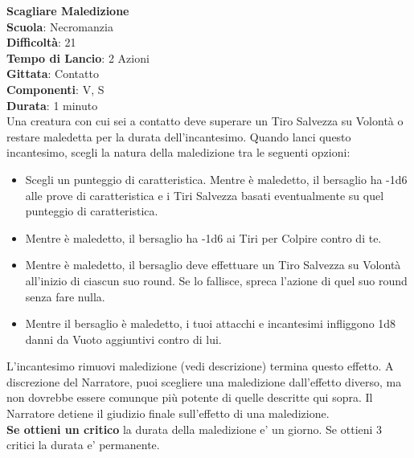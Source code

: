 \begin{multicols}{2}
\medskip\textbf{Scagliare Maledizione}\\
\textbf{Scuola}: Necromanzia\\
\textbf{Difficoltà}: 21\\
\textbf{Tempo di Lancio}: 2 Azioni\\
\textbf{Gittata}: Contatto\\
\textbf{Componenti}: V, S\\
\textbf{Durata}: 1 minuto\\
Una creatura con cui sei a contatto deve superare un Tiro Salvezza su Volontà o restare maledetta per la durata dell'incantesimo. Quando lanci questo incantesimo, scegli la natura della maledizione tra le seguenti opzioni:
\medskip
\begin{itemize}
\item
Scegli un punteggio di caratteristica. Mentre è maledetto, il bersaglio ha -1d6 alle prove di
caratteristica e i Tiri Salvezza basati eventualmente su quel punteggio di caratteristica.
\item
Mentre è maledetto, il bersaglio ha -1d6 ai Tiri per Colpire contro di te.
\item
Mentre è maledetto, il bersaglio deve effettuare un Tiro Salvezza su Volontà all'inizio di ciascun suo round. Se lo fallisce, spreca l'azione di quel suo round senza fare nulla.
\item
Mentre il bersaglio è maledetto, i tuoi attacchi e incantesimi infliggono 1d8 danni da Vuoto aggiuntivi contro di lui.
\end{itemize}
\medskip
L'incantesimo rimuovi maledizione (vedi descrizione) termina questo effetto. A discrezione del Narratore, puoi scegliere una maledizione dall'effetto diverso, ma non dovrebbe essere comunque più potente di quelle descritte qui sopra. Il Narratore detiene il giudizio finale sull'effetto di una maledizione.\\
\textbf{Se ottieni un critico} la durata della maledizione e' un giorno. Se ottieni 3 critici la durata e' permanente.


\end{multicols}
